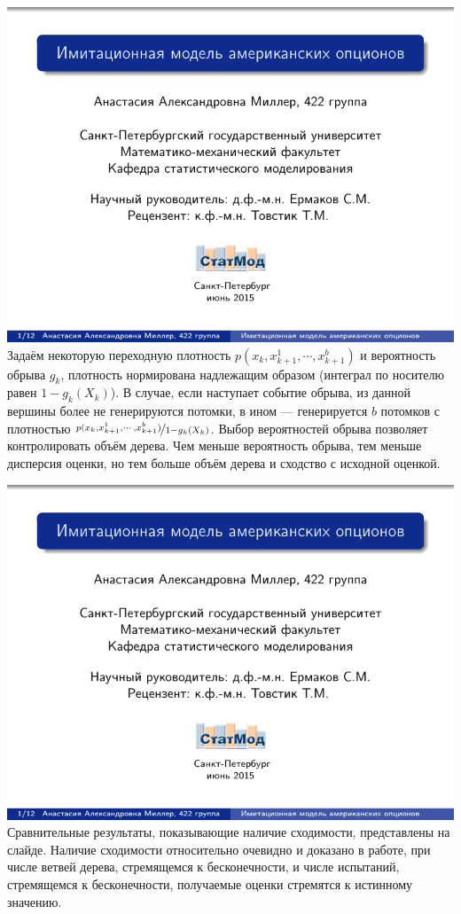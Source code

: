 \documentclass[14pt,a4paper]{extarticle}
\begin{document}
\includegraphics[page=\theslidenumber, width=\textwidth]{8th-semester-presentation.pdf}
Задаём некоторую переходную плотность $p(x_k, x_{k+1}^1, \cdots, x_{k+1}^b)$ и вероятность обрыва $g_k$, плотность нормирована надлежащим образом (интеграл по носителю равен $1-g_k(X_k)$). В случае, если наступает событие обрыва, из данной вершины более не генерируются потомки, в ином --- генерируется $b$ потомков с плотностью $\nicefrac{p(x_k, x_{k+1}^1, \cdots, x_{k+1}^b)}{1 - g_k(X_k)}$. Выбор вероятностей обрыва позволяет контролировать объём дерева. Чем меньше  вероятность обрыва, тем меньше дисперсия оценки, но тем больше объём дерева и сходство с исходной оценкой.

\includegraphics[page=\theslidenumber, width=\textwidth]{8th-semester-presentation.pdf}
Сравнительные результаты, показывающие наличие сходимости, представлены на слайде. Наличие сходимости относительно очевидно и доказано в работе, при числе ветвей дерева, стремящемся к бесконечности, и числе испытаний, стремящемся к бесконечности, получаемые оценки стремятся к истинному значению.
\end{document}
